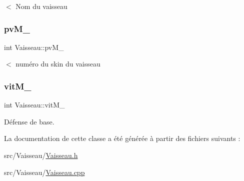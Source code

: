 $<$ Nom du vaisseau 

\mbox{\label{class_vaisseau_ac8b21f62b8c41f90864b1bca81d685de}} 
\subsubsection{\texorpdfstring{pv\+M\+\_\+}{pvM\_}}
{\footnotesize\ttfamily int Vaisseau\+::pv\+M\+\_\+\hspace{0.3cm}{\ttfamily [protected]}}



$<$ numéro du skin du vaisseau 

\mbox{\label{class_vaisseau_a7cf3915f4d4044ee28fd5e5633fce11c}} 
\subsubsection{\texorpdfstring{vit\+M\+\_\+}{vitM\_}}
{\footnotesize\ttfamily int Vaisseau\+::vit\+M\+\_\+\hspace{0.3cm}{\ttfamily [protected]}}



Défense de base. 



La documentation de cette classe a été générée à partir des fichiers suivants \+:\begin{DoxyCompactItemize}
\item 
src/\+Vaisseau/\hyperlink{_vaisseau_8h}{Vaisseau.\+h}\item 
src/\+Vaisseau/\hyperlink{_vaisseau_8cpp}{Vaisseau.\+cpp}\end{DoxyCompactItemize}
